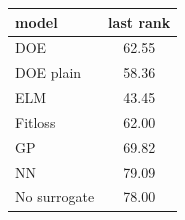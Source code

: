 \begin{tabular}{|lc|}
\hline
model & last rank\\
\hline
DOE & 62.55 \\
DOE plain & 58.36 \\
ELM & 43.45 \\
Fitloss & 62.00 \\
GP & 69.82 \\
NN & 79.09 \\
No surrogate & 78.00 \\
\hline
\end{tabular}
